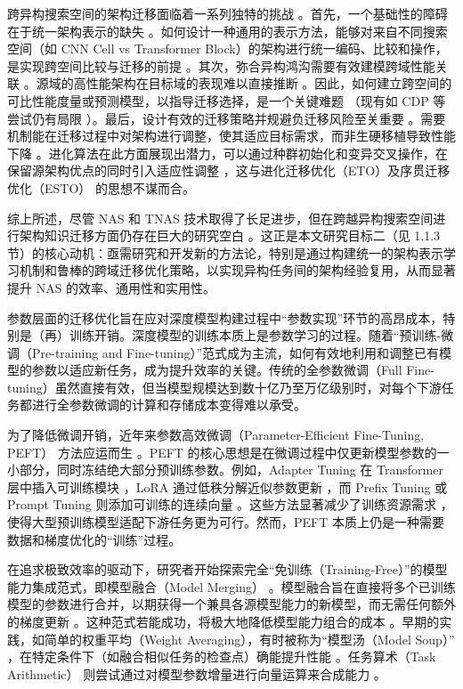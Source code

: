 \documentclass[../main.tex]{subfiles}
\begin{document}
跨异构搜索空间的架构迁移面临着一系列独特的挑战 。首先，一个基础性的障碍在于统一架构表示的缺失 。如何设计一种通用的表示方法，能够对来自不同搜索空间（如 CNN Cell vs Transformer Block）的架构进行统一编码、比较和操作，是实现跨空间比较与迁移的前提 。其次，弥合异构鸿沟需要有效建模跨域性能关联 。源域的高性能架构在目标域的表现难以直接推断 。因此，如何建立跨空间的可比性能度量或预测模型，以指导迁移选择，是一个关键难题 （现有如 CDP 等尝试仍有局限 ）。最后，设计有效的迁移策略并规避负迁移风险至关重要 。需要机制能在迁移过程中对架构进行调整，使其适应目标需求，而非生硬移植导致性能下降 。进化算法在此方面展现出潜力，可以通过种群初始化和变异交叉操作，在保留源架构优点的同时引入适应性调整 ，这与进化迁移优化（ETO）及序贯迁移优化（ESTO） 的思想不谋而合。

综上所述，尽管 NAS 和 TNAS 技术取得了长足进步，但在跨越异构搜索空间进行架构知识迁移方面仍存在巨大的研究空白 。这正是本文研究目标二（见 1.1.3 节）的核心动机：亟需研究和开发新的方法论，特别是通过构建统一的架构表示学习机制和鲁棒的跨域迁移优化策略，以实现异构任务间的架构经验复用，从而显著提升 NAS 的效率、通用性和实用性。


参数层面的迁移优化旨在应对深度模型构建过程中“参数实现”环节的高昂成本，特别是（再）训练开销。深度模型的训练本质上是参数学习的过程。随着“预训练-微调（Pre-training and Fine-tuning）”范式成为主流，如何有效地利用和调整已有模型的参数以适应新任务，成为提升效率的关键。传统的全参数微调（Full Fine-tuning）虽然直接有效，但当模型规模达到数十亿乃至万亿级别时，对每个下游任务都进行全参数微调的计算和存储成本变得难以承受。

为了降低微调开销，近年来参数高效微调（Parameter-Efficient Fine-Tuning, PEFT） 方法应运而生 。PEFT 的核心思想是在微调过程中仅更新模型参数的一小部分，同时冻结绝大部分预训练参数。例如，Adapter Tuning 在 Transformer 层中插入可训练模块 ，LoRA 通过低秩分解近似参数更新 ，而 Prefix Tuning 或 Prompt Tuning 则添加可训练的连续向量 。这些方法显著减少了训练资源需求 ，使得大型预训练模型适配下游任务更为可行。然而，PEFT 本质上仍是一种需要数据和梯度优化的“训练”过程。

在追求极致效率的驱动下，研究者开始探索完全“免训练（Training-Free）”的模型能力集成范式，即模型融合（Model Merging） 。模型融合旨在直接将多个已训练模型的参数进行合并，以期获得一个兼具各源模型能力的新模型，而无需任何额外的梯度更新 。这种范式若能成功，将极大地降低模型能力组合的成本 。早期的实践，如简单的权重平均（Weight Averaging），有时被称为“模型汤（Model Soup）” ，在特定条件下（如融合相似任务的检查点）确能提升性能 。任务算术（Task Arithmetic） 则尝试通过对模型参数增量进行向量运算来合成能力 。
\end{document}
